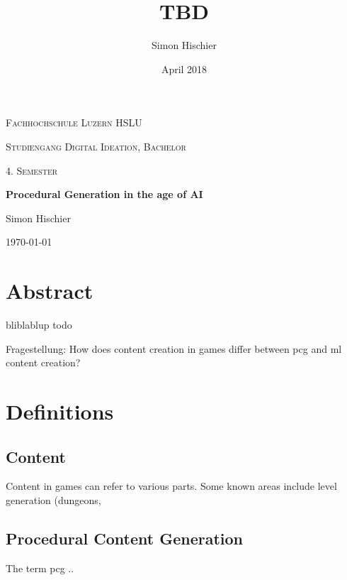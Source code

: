 \documentclass[10pt,a4paper]{article}
\title{TBD}
\author{Simon Hischier}
\date{April 2018}
\begin{document}
\begin{titlepage}
\centering
\vspace{1cm}
	{\scshape\LARGE Fachhochschule Luzern HSLU \par}
	\vspace{1cm}
	{\scshape\Large Studiengang Digital Ideation, Bachelor \par}
	
	{\scshape\Large 4. Semester\par}
	\vspace{1.5cm}
	{\huge\bf Procedural Generation in the age of AI\par}
	
	\vspace{10cm}
	{\Large Simon Hischier\par}
	\vfill

	{\large \today\par}
\end{titlepage}

\renewcommand{\contentsname}{Inhalt}
\tableofcontents
\newpage

\section{Abstract}
bliblablup todo

Fragestellung: How does content creation in games differ between \gls{pcg} and \gls{ml} content creation?

\section{Definitions}
\subsection{Content}
Content in games can refer to various parts. Some known areas include level generation (dungeons, 

\subsection{Procedural Content Generation}
The term \gls{pcg} ..
\end{document}
